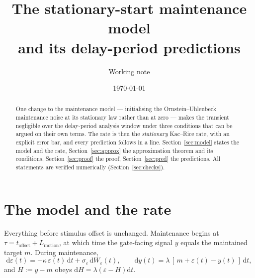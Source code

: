 \documentclass[11pt,a4paper]{article}
\title{The stationary-start maintenance model\\
and its delay-period predictions}
\author{Working note}
\date{\today}
\theoremstyle{remark}\newtheorem{remark}[proposition]{Remark}
\newcommand{\dd}{\mathrm{d}}
\begin{document}
\maketitle

\begin{center}\end{center}

\bigskip

\begin{abstract}\noindent
One change to the maintenance model --- initialising the Ornstein--Uhlenbeck
maintenance noise at its stationary law rather than at zero --- makes the transient
negligible over the delay-period analysis window under three conditions that can be
argued on their own terms. The rate is then the \emph{stationary} Kac--Rice rate, with
an explicit error bar, and every prediction follows in a line.
Section~\ref{sec:model} states the model and the rate, Section~\ref{sec:approx} the
approximation theorem and its conditions, Section~\ref{sec:proof} the proof,
Section~\ref{sec:pred} the predictions. All statements are verified numerically
(Section~\ref{sec:checks}).
\end{abstract}

\section{The model and the rate}\label{sec:model}

Everything before stimulus offset is unchanged. Maintenance begins at
$\tau=t_{\mathrm{offset}}+L_{\mathrm{motion}}$, at which time the gate-facing signal
$y$ equals the maintained target $m$. During maintenance,
\begin{equation}
\dd\varepsilon(t)=-\kappa\,\varepsilon(t)\,\dd t+\sigma_\varepsilon\,\dd W_\varepsilon(t),
\qquad
\dd y(t)=\lambda\,[\,m+\varepsilon(t)-y(t)\,]\,\dd t ,
\label{eq:sde}
\end{equation}
and $H:=y-m$ obeys $\dd H=\lambda(\varepsilon-H)\dd t$.
\end{document}
